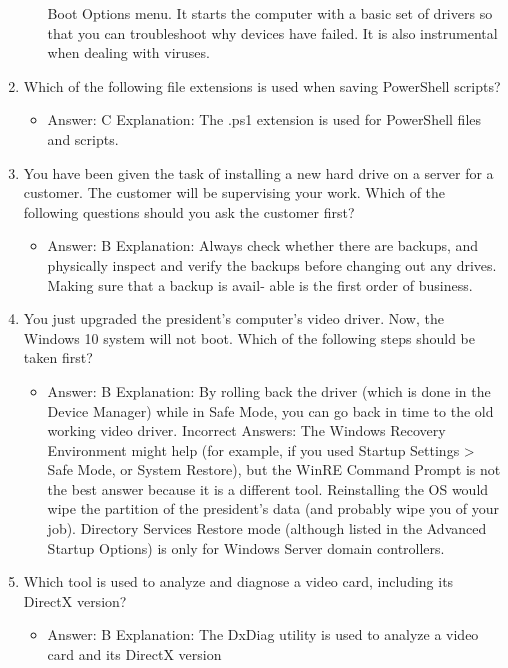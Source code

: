 \documentclass{article}
\begin{document}
\begin{enumerate}
\begin{itemize}
Boot Options menu. It starts the computer with a basic set of drivers so that you can
troubleshoot why devices have failed. It is also instrumental when dealing with viruses.
     \end{itemize}
      \item Which of the following file extensions is used when saving
PowerShell scripts?
     \begin{itemize}
         \item Answer: C
Explanation: The .ps1 extension is used for PowerShell files and scripts.
     \end{itemize}
     \item You have been given the task of installing a new hard drive on
a server for a customer. The customer will be supervising your
work. Which of the following questions should you ask the customer
first?
     \begin{itemize}
         \item Answer: B
Explanation: Always check whether there are backups, and physically inspect and
verify the backups before changing out any drives. Making sure that a backup is avail-
able is the first order of business.
     \end{itemize}
      \item You just upgraded the president’s computer’s video driver. Now,
the Windows 10 system will not boot. Which of the following steps
should be taken first?
     \begin{itemize}
         \item Answer: B
Explanation: By rolling back the driver (which is done in the Device Manager) while in
Safe Mode, you can go back in time to the old working video driver.
Incorrect Answers: The Windows Recovery Environment might help (for example, if
you used Startup Settings > Safe Mode, or System Restore), but the WinRE Command
Prompt is not the best answer because it is a different tool. Reinstalling the OS would
wipe the partition of the president’s data (and probably wipe you of your job). Directory
Services Restore mode (although listed in the Advanced Startup Options) is only for
Windows Server domain controllers.
     \end{itemize}
      \item Which tool is used to analyze and diagnose a video card, including
its DirectX version?
     \begin{itemize}
         \item Answer: B
Explanation: The DxDiag utility is used to analyze a video card and its DirectX version

\end{itemize}
\end{enumerate}
\end{document}
